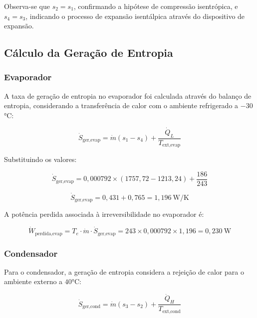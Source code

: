Observa-se que $s_2 = s_1$, confirmando a hipótese de compressão isentrópica, e $s_4 = s_3$, indicando o processo de expansão isentálpica através do dispositivo de expansão.

\subsection{Cálculo da Geração de Entropia}

\subsubsection{Evaporador}

A taxa de geração de entropia no evaporador foi calculada através do balanço de entropia, considerando a transferência de calor com o ambiente refrigerado a $-30$°C:

\begin{equation}
    \dot{S}_{\text{ger,evap}} = \dot{m}(s_1 - s_4) + \frac{\dot{Q}_L}{T_{\text{ext,evap}}}
\end{equation}

Substituindo os valores:

\begin{equation}
    \dot{S}_{\text{ger,evap}} = 0{,}000792 \times (1757{,}72 - 1213{,}24) + \frac{186}{243}
\end{equation}

\begin{equation}
    \dot{S}_{\text{ger,evap}} = 0{,}431 + 0{,}765 = 1{,}196~\text{W/K}
\end{equation}

A potência perdida associada à irreversibilidade no evaporador é:

\begin{equation}
    \dot{W}_{\text{perdida,evap}} = T_e \cdot \dot{m} \cdot \dot{S}_{\text{ger,evap}} = 243 \times 0{,}000792 \times 1{,}196 = 0{,}230~\text{W}
\end{equation}

\subsubsection{Condensador}

Para o condensador, a geração de entropia considera a rejeição de calor para o ambiente externo a $40$°C:

\begin{equation}
    \dot{S}_{\text{ger,cond}} = \dot{m}(s_3 - s_2) + \frac{\dot{Q}_H}{T_{\text{ext,cond}}}
\end{equation}

